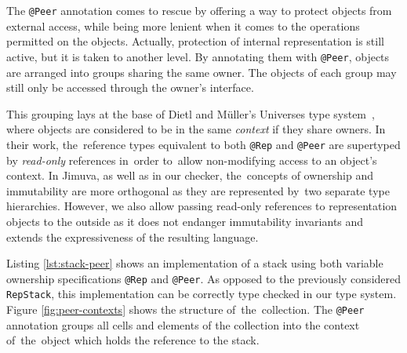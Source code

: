 \documentclass{pracamgr}
\theoremstyle{break}
\theoremstyle{break}
\theoremstyle{break}
\begin{document}
The \texttt{@Peer} annotation comes to rescue by offering a way to
protect objects from external access, while being more lenient when it
comes to the operations permitted on the objects. Actually, protection
of internal representation is still active, but it is taken to another
level. By annotating them with \texttt{@Peer}, objects are arranged
into groups sharing the same owner. The objects of each group may
still only be accessed through the owner's interface.

This grouping lays at the base of Dietl and Müller's Universes type
system~\cite{universes}, where objects are considered to be in the
same \emph{context} if they share owners. In their work, the~reference
types equivalent to both \texttt{@Rep} and \texttt{@Peer} are
supertyped by \emph{read-only} references in~order to~allow
non-modifying access to an object's context. In Jimuva, as well as in
our checker, the~concepts of ownership and immutability are more
orthogonal as they are represented by~two separate type
hierarchies. However, we also allow passing read-only references to
representation objects to the outside as it does not endanger
immutability invariants and extends the expressiveness of the
resulting language.



Listing \ref{lst:stack-peer} shows an implementation of a stack using
both variable ownership specifications \texttt{@Rep} and
\texttt{@Peer}. As opposed to the previously considered
\texttt{RepStack}, this implementation can be correctly type checked
in our type system. Figure \ref{fig:peer-contexts} shows the structure
of~the~col\-lec\-tion. The \texttt{@Peer} annotation groups all cells and
elements of the collection into the context of~the~object which holds
the reference to the stack.
\end{document}
